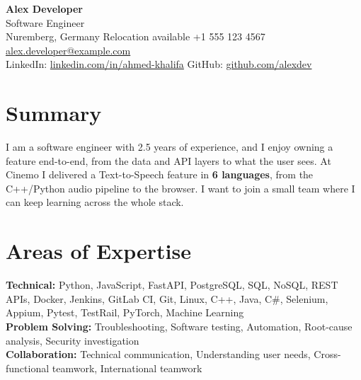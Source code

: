 \documentclass[letterpaper,10pt]{article}
\begin{document}
\begin{center}
  {\LARGE\bfseries Alex Developer}\\[4pt]
  {\normalsize Software Engineer}\\[4pt]
  Nuremberg, Germany \textbar{} Relocation available \textbar{} +1 555 123 4567 \textbar{}
  \href{mailto:alex.developer@example.com}{alex.developer@example.com}\\[3pt]
  LinkedIn: \href{https://linkedin.com/in/alex-developer}{linkedin.com/in/ahmed-khalifa} \textbar{}
  GitHub: \href{https://github.com/alexdev}{github.com/alexdev}
\end{center}

\section{Summary}
I am a software engineer with 2.5 years of experience, and I enjoy owning a feature end-to-end, from the data and API layers to what the user sees. At Cinemo I delivered a Text-to-Speech feature in \textbf{6 languages}, from the C++/Python audio pipeline to the browser. I want to join a small team where I can keep learning across the whole stack.

\section{Areas of Expertise}
\textbf{Technical:} Python, JavaScript, FastAPI, PostgreSQL, SQL, NoSQL, REST APIs, Docker, Jenkins, GitLab CI, Git, Linux, C++, Java, C\#, Selenium, Appium, Pytest, TestRail, PyTorch, Machine Learning\\[3pt]
\textbf{Problem Solving:} Troubleshooting, Software testing, Automation, Root-cause analysis, Security investigation\\[3pt]
\textbf{Collaboration:} Technical communication, Understanding user needs, Cross-functional teamwork, International teamwork

\end{document}
